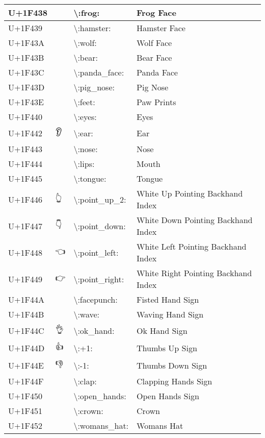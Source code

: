 \begin{table}[h]
\begin{tabulary}{\linewidth}{|L|L|L|L|}
\hline
U+1F438 & 🐸 & {\textbackslash}:frog: & Frog Face \\
\hline
U+1F439 & 🐹 & {\textbackslash}:hamster: & Hamster Face \\
\hline
U+1F43A & 🐺 & {\textbackslash}:wolf: & Wolf Face \\
\hline
U+1F43B & 🐻 & {\textbackslash}:bear: & Bear Face \\
\hline
U+1F43C & 🐼 & {\textbackslash}:panda\_face: & Panda Face \\
\hline
U+1F43D & 🐽 & {\textbackslash}:pig\_nose: & Pig Nose \\
\hline
U+1F43E & 🐾 & {\textbackslash}:feet: & Paw Prints \\
\hline
U+1F440 & 👀 & {\textbackslash}:eyes: & Eyes \\
\hline
U+1F442 & 👂 & {\textbackslash}:ear: & Ear \\
\hline
U+1F443 & 👃 & {\textbackslash}:nose: & Nose \\
\hline
U+1F444 & 👄 & {\textbackslash}:lips: & Mouth \\
\hline
U+1F445 & 👅 & {\textbackslash}:tongue: & Tongue \\
\hline
U+1F446 & 👆 & {\textbackslash}:point\_up\_2: & White Up Pointing Backhand Index \\
\hline
U+1F447 & 👇 & {\textbackslash}:point\_down: & White Down Pointing Backhand Index \\
\hline
U+1F448 & 👈 & {\textbackslash}:point\_left: & White Left Pointing Backhand Index \\
\hline
U+1F449 & 👉 & {\textbackslash}:point\_right: & White Right Pointing Backhand Index \\
\hline
U+1F44A & 👊 & {\textbackslash}:facepunch: & Fisted Hand Sign \\
\hline
U+1F44B & 👋 & {\textbackslash}:wave: & Waving Hand Sign \\
\hline
U+1F44C & 👌 & {\textbackslash}:ok\_hand: & Ok Hand Sign \\
\hline
U+1F44D & 👍 & {\textbackslash}:+1: & Thumbs Up Sign \\
\hline
U+1F44E & 👎 & {\textbackslash}:-1: & Thumbs Down Sign \\
\hline
U+1F44F & 👏 & {\textbackslash}:clap: & Clapping Hands Sign \\
\hline
U+1F450 & 👐 & {\textbackslash}:open\_hands: & Open Hands Sign \\
\hline
U+1F451 & 👑 & {\textbackslash}:crown: & Crown \\
\hline
U+1F452 & 👒 & {\textbackslash}:womans\_hat: & Womans Hat \\

\end{tabulary}
\end{table}
